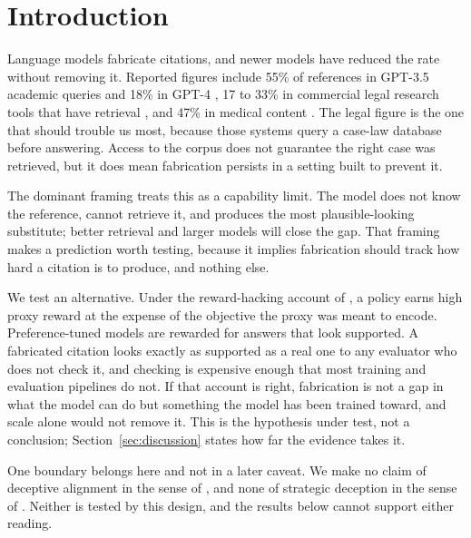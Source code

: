 
\section{Introduction}

Language models fabricate citations, and newer models have reduced the rate
without removing it. Reported figures include 55\% of references in GPT-3.5
academic queries and 18\% in GPT-4 \citep{walters2023}, 17 to 33\% in commercial legal research tools that have
retrieval \citep{magesh2024}, and 47\% in medical content
\citep{bhattacharyya2023}. The legal figure is the one that should trouble us
most, because those systems query a case-law database before answering. Access
to the corpus does not guarantee the right case was retrieved, but it does mean
fabrication persists in a setting built to prevent it.

The dominant framing treats this as a capability limit. The model does not know
the reference, cannot retrieve it, and produces the most plausible-looking
substitute; better retrieval and larger models will close the gap. That framing
makes a prediction worth testing, because it implies fabrication should track
how hard a citation is to produce, and nothing else.

We test an alternative. Under the reward-hacking account of
\citet{skalse2022}, a policy earns high proxy reward at the expense of the
objective the proxy was meant to encode. Preference-tuned models are rewarded
for answers that look supported. A fabricated citation looks exactly as
supported as a real one to any evaluator who does not check it, and checking is
expensive enough that most training and evaluation pipelines do not. If that
account is right, fabrication is not a gap in what the model can do but
something the model has been trained toward, and scale alone would not remove
it. This is the hypothesis under test, not a conclusion; Section~\ref{sec:discussion}
states how far the evidence takes it.

One boundary belongs here and not in a later caveat. We make no claim of
deceptive alignment in the sense of \citet{hubinger2019}, and none of strategic
deception in the sense of \citet{park2024}. Neither is tested by this design,
and the results below cannot support either reading.

